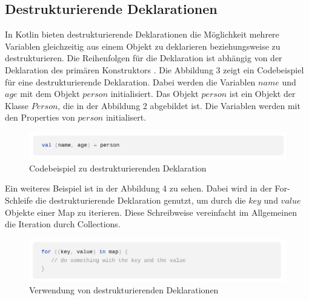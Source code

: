 \documentclass{article}
\begin{document}
\subsection{Destrukturierende Deklarationen}
In Kotlin bieten destrukturierende Deklarationen die Möglichkeit mehrere Variablen gleichzeitig aus einem Objekt zu deklarieren beziehungsweise zu destrukturieren. Die Reihenfolgen für die Deklaration ist abhängig von der Deklaration des primären Konstruktors \cite{KotlinLangDoc}. Die Abbildung 3 zeigt ein Codebeispiel für eine destrukturierende Deklaration. Dabei werden die Variablen $name$ und $age$ mit dem Objekt $person$ initialisiert. Das Objekt $person$ ist ein Objekt der Klasse $Person$, die in der Abbildung 2 abgebildet ist. Die Variablen werden mit den Properties von $person$ initialisert.
\begin{figure}[!htb]
    \centering
    \includegraphics[width=\linewidth]{img/DestrucDecl.png}
    \caption{Codebeispiel zu destrukturierenden Deklaration\footnotemark}
\end{figure}
\newline
Ein weiteres Beispiel ist in der Abbildung 4 zu sehen. Dabei wird in der For-Schleife die destrukturierende Deklaration genutzt, um durch die $key$ und $value$ Objekte einer Map zu iterieren. Diese Schreibweise vereinfacht im Allgemeinen die Iteration durch Collections.
\begin{figure}[!htb]
    \centering
    \includegraphics[width=\linewidth]{img/DestrucDecl2.png}
    \caption{Verwendung von destrukturierenden Deklarationen \footnotemark}
\end{figure}
\end{document}
